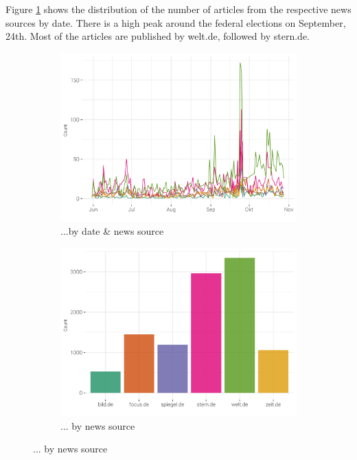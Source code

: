 \documentclass[12pt,a4paper,notitlepage]{article}
\begin{document}
Figure \ref{fig_distr} shows the distribution of the number of articles from the respective news sources by date. There is a high peak around the federal elections on September, 24th. Most of the articles are published by welt.de, followed by stern.de.  

\begin{figure}[H]
	\caption{Article distribution...}
	\begin{center}
		\begin{subfigure}[normla]{0.49\textwidth}
			\includegraphics[width=\textwidth]{../figs/timeline.png}
			\caption{...by date \& news source}
		\end{subfigure}
		\begin{subfigure}[normla]{0.49\textwidth}
			\includegraphics[width=\textwidth]{../figs/bar.png}
			\caption{... by news source}
		\end{subfigure}
	\end{center}
	\label{fig_distr}
\end{figure}
\end{document}

